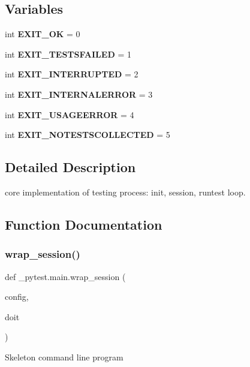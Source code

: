 \subsection*{Variables}
\begin{DoxyCompactItemize}
\item 
\mbox{\label{namespace__pytest_1_1main_acde602b354ebbe2c8468a714a48f4ac0}} 
int {\bfseries E\+X\+I\+T\+\_\+\+OK} = 0
\item 
\mbox{\label{namespace__pytest_1_1main_a6c2b2ea2fc3518a9e885cae10c9dc11e}} 
int {\bfseries E\+X\+I\+T\+\_\+\+T\+E\+S\+T\+S\+F\+A\+I\+L\+ED} = 1
\item 
\mbox{\label{namespace__pytest_1_1main_a2c13331313f6be81f4f588b3b9e9495f}} 
int {\bfseries E\+X\+I\+T\+\_\+\+I\+N\+T\+E\+R\+R\+U\+P\+T\+ED} = 2
\item 
\mbox{\label{namespace__pytest_1_1main_a6751aac4cc9c05ab9df6a213e7f90b20}} 
int {\bfseries E\+X\+I\+T\+\_\+\+I\+N\+T\+E\+R\+N\+A\+L\+E\+R\+R\+OR} = 3
\item 
\mbox{\label{namespace__pytest_1_1main_aa4deb08c6d2887aa7f59a72c6cdf482a}} 
int {\bfseries E\+X\+I\+T\+\_\+\+U\+S\+A\+G\+E\+E\+R\+R\+OR} = 4
\item 
\mbox{\label{namespace__pytest_1_1main_a83f312f696935df5a0ad5a19abe6ed33}} 
int {\bfseries E\+X\+I\+T\+\_\+\+N\+O\+T\+E\+S\+T\+S\+C\+O\+L\+L\+E\+C\+T\+ED} = 5
\end{DoxyCompactItemize}


\subsection{Detailed Description}
\begin{DoxyVerb}core implementation of testing process: init, session, runtest loop. \end{DoxyVerb}
 

\subsection{Function Documentation}
\mbox{\label{namespace__pytest_1_1main_a68138e010c9e1b4941cfcce684b9c7b6}} 
\subsubsection{\texorpdfstring{wrap\+\_\+session()}{wrap\_session()}}
{\footnotesize\ttfamily def \+\_\+pytest.\+main.\+wrap\+\_\+session (\begin{DoxyParamCaption}\item[{}]{config,  }\item[{}]{doit }\end{DoxyParamCaption})}

\begin{DoxyVerb}Skeleton command line program\end{DoxyVerb}
 